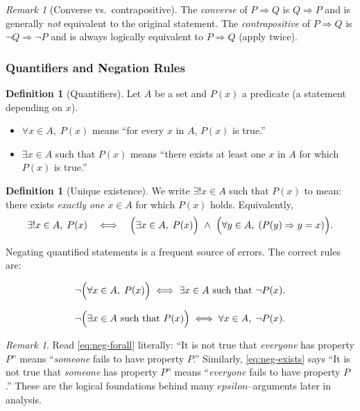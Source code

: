 \documentclass[12pt]{article}
\numberwithin{equation}{section}
\def\eps{epsilon}
\newcommand{\eps}{\varepsilon}               %
\theoremstyle{plain}
\theoremstyle{definition}
\newtheorem{definition}[theorem]{Definition}
\theoremstyle{remark}
\newtheorem{remark}[theorem]{Remark}
\begin{document}
\begin{remark}[Converse vs.\ contrapositive]
The \emph{converse} of $P\Rightarrow Q$ is $Q\Rightarrow P$ and is generally \emph{not} equivalent to the original statement.  
The \emph{contrapositive} of $P\Rightarrow Q$ is $\neg Q \Rightarrow \neg P$ and is always logically equivalent to $P\Rightarrow Q$ (apply  twice).
\end{remark}

\subsubsection{Quantifiers and Negation Rules}

\begin{definition}[Quantifiers]
Let $A$ be a set and $P(x)$ a predicate (a statement depending on $x$).
\begin{itemize}
  \item $\forall x\in A,\; P(x)$ means ``for every $x$ in $A$, $P(x)$ is true.''
  \item $\exists x\in A$ such that $P(x)$ means ``there exists at least one $x$ in $A$ for which $P(x)$ is true.''
\end{itemize}
\end{definition}

\begin{definition}[Unique existence]
We write $\exists! x\in A$ such that $P(x)$ to mean: there exists \emph{exactly one} $x\in A$ for which $P(x)$ holds.
Equivalently,
\[
\exists! x\in A,\; P(x)
\quad \Longleftrightarrow \quad
\Bigl(\exists x\in A,\; P(x)\Bigr)\ \wedge\
\Bigl(\forall y\in A,\; (P(y)\Rightarrow y=x)\Bigr).
\]
\end{definition}

Negating quantified statements is a frequent source of errors. The correct rules are:

\begin{equation}\label{eq:neg-forall}
\neg\Bigl(\forall x\in A,\; P(x)\Bigr)
\;\Longleftrightarrow\;
\exists x\in A \text{ such that } \neg P(x).
\end{equation}

\begin{equation}\label{eq:neg-exists}
\neg\Bigl(\exists x\in A \text{ such that } P(x)\Bigr)
\;\Longleftrightarrow\;
\forall x\in A,\; \neg P(x).
\end{equation}

\begin{remark}
Read \cref{eq:neg-forall} literally: ``It is not true that \emph{everyone} has property $P$'' means ``\emph{someone} fails to have property $P$.''  
Similarly, \cref{eq:neg-exists} says ``It is not true that \emph{someone} has property $P$'' means ``\emph{everyone} fails to have property $P$.''  
These are the logical foundations behind many $\eps$--arguments later in analysis.
\end{remark}
\end{document}
